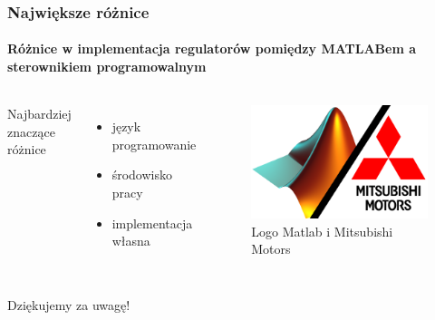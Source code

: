 \documentclass[aspectratio=169]{beamer}
\begin{document}
\begin{frame}
\frametitle{Największe różnice}
\framesubtitle{Różnice w implementacja regulatorów pomiędzy MATLABem a sterownikiem programowalnym}

\begin{columns} 


Najbardziej znaczące różnice
\begin{itemize}
  \item język programowanie
  \item środowisko pracy
  \item implementacja własna
\end{itemize}

\begin{figure}
	\includegraphics[width=\linewidth]{Rysunki/Matlab_vs_PLC2.png}
	\caption {Logo Matlab i Mitsubishi Motors}
\end{figure}


\end{columns}
             
\end{frame}

\begin{frame}
\frametitle{}



\begin{center}
\LARGE Dziękujemy za uwagę!

\end{center}
\end{frame}
\end{document}
